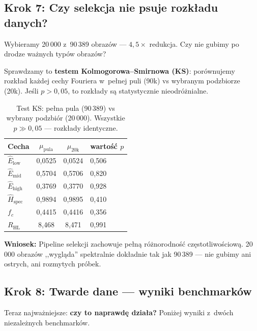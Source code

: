 \subsection{Krok 7: Czy selekcja nie psuje rozkładu danych?}
\label{sec:krok7}

Wybieramy 20\,000 z~90\,389 obrazów --- $4{,}5\times$ redukcja.  Czy nie
gubimy po drodze ważnych typów obrazów?

Sprawdzamy to \textbf{testem Kolmogorowa--Smirnowa (KS)}: porównujemy
rozkład każdej cechy Fouriera w~pełnej puli (90k) vs wybranym podzbiorze (20k).
Jeśli $p > 0{,}05$, to rozkłady są statystycznie nieodróżnialne.

\begin{table}[h]
\centering
\caption{Test KS: pełna pula (90\,389) vs wybrany podzbiór (20\,000).
         Wszystkie $p \gg 0{,}05$ --- rozkłady identyczne.}
\label{tab:ks_simple}
\begin{tabular}{lccl}
\toprule
\textbf{Cecha} & $\mu_{\text{pula}}$ & $\mu_{\text{20k}}$ & wartość $p$ \\
\midrule
$\hat{E}_{\text{low}}$  & 0{,}0525 & 0{,}0524 & 0{,}506 \\
$\hat{E}_{\text{mid}}$  & 0{,}5704 & 0{,}5706 & 0{,}820 \\
$\hat{E}_{\text{high}}$ & 0{,}3769 & 0{,}3770 & 0{,}928 \\
$\hat{H}_{\text{spec}}$ & 0{,}9894 & 0{,}9895 & 0{,}410 \\
$f_c$                   & 0{,}4415 & 0{,}4416 & 0{,}356 \\
$R_{\text{HL}}$         & 8{,}468  & 8{,}471  & 0{,}991 \\
\bottomrule
\end{tabular}
\end{table}

\textbf{Wniosek:} Pipeline selekcji zachowuje pełną różnorodność
częstotliwościową.  20\,000 obrazów ,,wygląda'' spektralnie dokładnie tak jak
90\,389 --- nie gubimy ani ostrych, ani rozmytych próbek.


\subsection{Krok 8: Twarde dane --- wyniki benchmarków}
\label{sec:krok8}

Teraz najważniejsze: \textbf{czy to naprawdę działa?}  Poniżej wyniki
z~dwóch niezależnych benchmarków.

